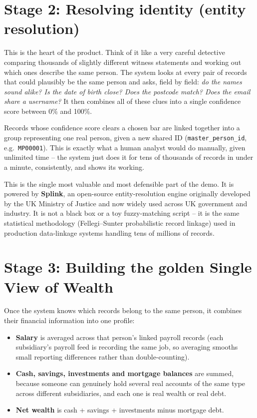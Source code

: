 \documentclass[11pt]{report}
\newcommand{\code}[1]{\lstinline[style=plain]!#1!}
\begin{document}
\section{Stage 2: Resolving identity (entity resolution)}

This is the heart of the product. Think of it like a very careful detective comparing thousands of slightly different witness statements and working out which ones describe the same person. The system looks at every pair of records that could plausibly be the same person and asks, field by field: \emph{do the names sound alike? Is the date of birth close? Does the postcode match? Does the email share a username?} It then combines all of these clues into a single confidence score between 0\% and 100\%.

Records whose confidence score clears a chosen bar are linked together into a group representing one real person, given a new shared ID (\code{master_person_id}, e.g.\ \code{MP00001}). This is exactly what a human analyst would do manually, given unlimited time -- the system just does it for tens of thousands of records in under a minute, consistently, and shows its working.

\begin{bizbox}
This is the single most valuable and most defensible part of the demo. It is powered by \textbf{Splink}, an open-source entity-resolution engine originally developed by the UK Ministry of Justice and now widely used across UK government and industry. It is not a black box or a toy fuzzy-matching script -- it is the same statistical methodology (Fellegi--Sunter probabilistic record linkage) used in production data-linkage systems handling tens of millions of records.
\end{bizbox}

\section{Stage 3: Building the golden Single View of Wealth}

Once the system knows which records belong to the same person, it combines their financial information into one profile:

\begin{itemize}
\item \textbf{Salary} is averaged across that person's linked payroll records (each subsidiary's payroll feed is recording the same job, so averaging smooths small reporting differences rather than double-counting).
\item \textbf{Cash, savings, investments and mortgage balances} are summed, because someone can genuinely hold several real accounts of the same type across different subsidiaries, and each one is real wealth or real debt.
\item \textbf{Net wealth} is cash + savings + investments minus mortgage debt.
\end{itemize}
\end{document}
